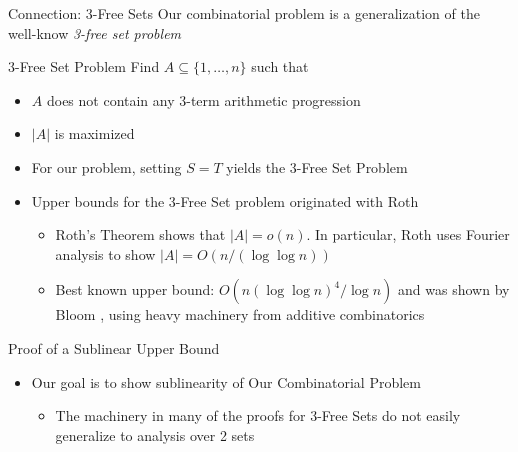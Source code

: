 \begin{frame}{Connection: 3-Free Sets}
Our combinatorial problem is a generalization of the well-know \textit{3-free set problem}

\begin{block}{3-Free Set Problem}
	Find $A \subseteq \{1,\dotsc,n\}$ such that
	\begin{itemize}
		\item $A$ does not contain any 3-term arithmetic progression
		\item $|A|$ is maximized
	\end{itemize}
\end{block}
\begin{itemize}
	\item<2-> For our problem, setting $S = T$ yields the 3-Free Set Problem
	\item<3-> Upper bounds for the 3-Free Set problem originated with Roth \cite{Roth53}
	\begin{itemize}
		\item Roth's Theorem shows that $|A| = o(n)$. In particular, Roth uses Fourier analysis to show $|A| = O(n / (\log \log n))$
		\item Best known upper bound: $O(n(\log \log n)^4 / \log n)$ and was shown by Bloom \cite{Bloom16}, using heavy machinery from additive combinatorics
	\end{itemize}
\end{itemize}
\end{frame}

\begin{frame}{Proof of a Sublinear Upper Bound}

\begin{itemize}
	\item Our goal is to show sublinearity of Our Combinatorial Problem
	\begin{itemize}
		\item The machinery in many of the proofs for 3-Free Sets do not easily generalize to analysis over 2 sets 
	\end{itemize}
\end{itemize}




\end{frame}



